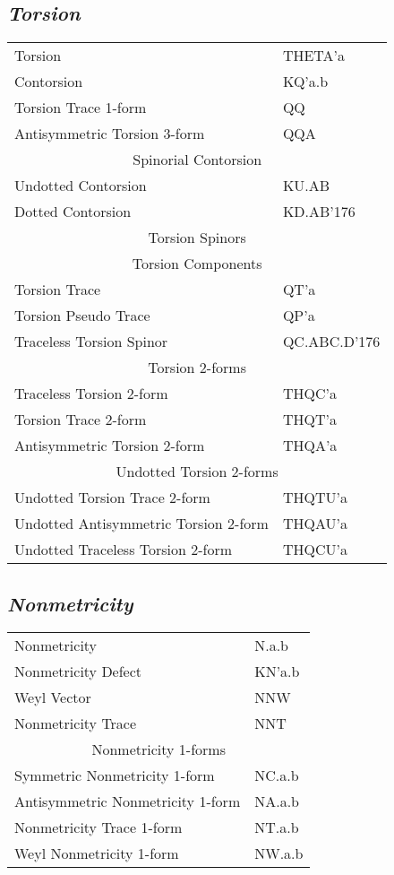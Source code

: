 \documentclass[twocolumn]{article}
\newcommand{\grgtt}{\ttfamily}
\renewcommand{\tt}{\grgtt}
\newcommand{\cc}{{\tt \char'176}}           %
\begin{document}
\subsection{\sf\slshape  Torsion}
\begin{tabular}{|l|l|}\hline
\tt    Torsion    &\tt  THETA'a\\
\tt    Contorsion &\tt  KQ'a.b\\
\tt    Torsion Trace 1-form         &\tt   QQ\\
\tt    Antisymmetric Torsion 3-form &\tt  QQA\\
\hline
\multicolumn{2}{|c|}{\tt Spinorial Contorsion}\\
\tt    Undotted Contorsion   &\tt  KU.AB\\
\tt    Dotted Contorsion     &\tt  KD.AB\cc\\
\hline
\multicolumn{2}{|c|}{\tt    Torsion Spinors    }\\
\multicolumn{2}{|c|}{\tt    Torsion Components }\\
\tt    Torsion Trace               &\tt    QT'a\\
\tt    Torsion Pseudo Trace        &\tt    QP'a\\
\tt    Traceless Torsion Spinor    &\tt    QC.ABC.D\cc\\
\hline
\multicolumn{2}{|c|}{\tt    Torsion 2-forms}\\
\tt    Traceless Torsion 2-form     &\tt   THQC'a\\
\tt    Torsion Trace 2-form         &\tt   THQT'a\\
\tt    Antisymmetric Torsion 2-form &\tt   THQA'a\\
\hline
\multicolumn{2}{|c|}{\tt    Undotted Torsion 2-forms}\\
\tt    Undotted Torsion Trace 2-form         &\tt   THQTU'a\\
\tt    Undotted Antisymmetric Torsion 2-form &\tt   THQAU'a\\
\tt    Undotted Traceless Torsion 2-form     &\tt   THQCU'a\\
\hline\end{tabular}

\subsection{\sf\slshape  Nonmetricity}
\begin{tabular}{|l|l|}\hline
\tt    Nonmetricity        &\tt   N.a.b\\
\tt    Nonmetricity Defect &\tt   KN'a.b\\
\tt    Weyl Vector         &\tt   NNW\\
\tt    Nonmetricity Trace  &\tt   NNT\\
\hline
\multicolumn{2}{|c|}{\tt    Nonmetricity 1-forms}\\
\tt    Symmetric Nonmetricity 1-form     &\tt   NC.a.b\\
\tt    Antisymmetric Nonmetricity 1-form &\tt   NA.a.b\\
\tt    Nonmetricity Trace  1-form        &\tt   NT.a.b\\
\tt    Weyl Nonmetricity 1-form          &\tt   NW.a.b\\
\hline\end{tabular}
\end{document}
